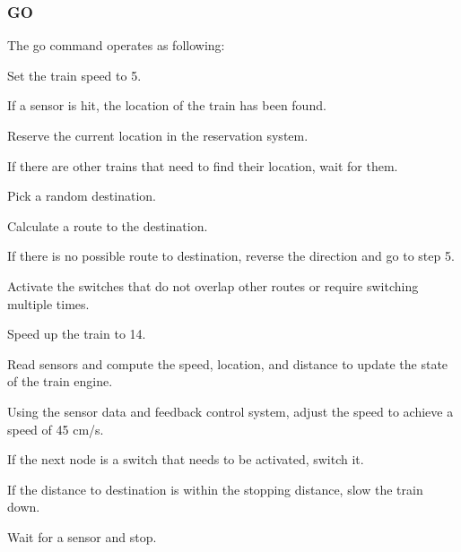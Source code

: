 \documentclass[letterpaper]{article}
\begin{document}
\subsubsection{GO%
  \label{go}%
}

The go command operates as following:
\setcounter{listcnt0}{0}
\begin{list}{.}
{
\setlength{\rightmargin}{\leftmargin}
}

\item Set the train speed to 5.

\item If a sensor is hit, the location of the train has been found.

\item Reserve the current location in the reservation system.

\item If there are other trains that need to find their location, wait for them.

\item Pick a random destination.

\item Calculate a route to the destination.

\item If there is no possible route to destination, reverse the direction and go to step 5.

\item Activate the switches that do not overlap other routes or require switching multiple times.

\item Speed up the train to 14.

\item Read sensors and compute the speed, location, and distance to update the state of the train engine.

\item Using the sensor data and  feedback control system, adjust the speed to achieve a speed of 45 cm/s.

\item If the next node is a switch that needs to be activated, switch it.

\item If the distance to destination is within the stopping distance, slow the train down.

\item Wait for a sensor and stop.
\end{list}
\end{document}
